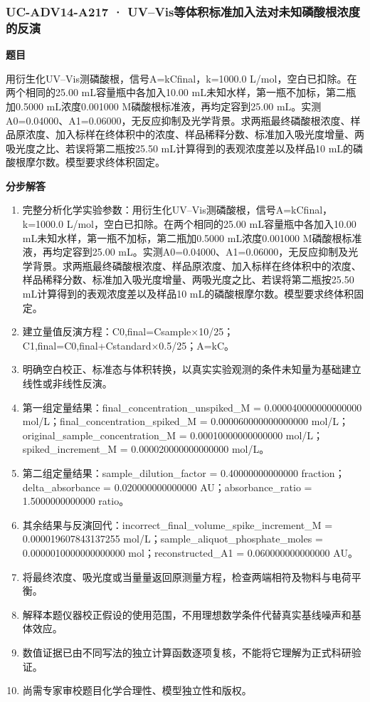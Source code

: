 \documentclass[UTF8,11pt,a4paper]{ctexart}
\begin{document}
\subsubsection*{UC-ADV14-A217 · UV–Vis等体积标准加入法对未知磷酸根浓度的反演}
\noindent\textbf{题目}\par
用衍生化UV–Vis测磷酸根，信号A=kCfinal，k=1000.0 L/mol，空白已扣除。在两个相同的25.00 mL容量瓶中各加入10.00 mL未知水样，第一瓶不加标，第二瓶加0.5000 mL浓度0.001000 M磷酸根标准液，再均定容到25.00 mL。实测A0=0.04000、A1=0.06000，无反应抑制及光学背景。求两瓶最终磷酸根浓度、样品原浓度、加入标样在终体积中的浓度、样品稀释分数、标准加入吸光度增量、两吸光度之比、若误将第二瓶按25.50 mL计算得到的表观浓度差以及样品10 mL的磷酸根摩尔数。模型要求终体积固定。\par
\medskip\noindent\textbf{分步解答}
\begin{enumerate}
\item 完整分析化学实验参数：用衍生化UV–Vis测磷酸根，信号A=kCfinal，k=1000.0 L/mol，空白已扣除。在两个相同的25.00 mL容量瓶中各加入10.00 mL未知水样，第一瓶不加标，第二瓶加0.5000 mL浓度0.001000 M磷酸根标准液，再均定容到25.00 mL。实测A0=0.04000、A1=0.06000，无反应抑制及光学背景。求两瓶最终磷酸根浓度、样品原浓度、加入标样在终体积中的浓度、样品稀释分数、标准加入吸光度增量、两吸光度之比、若误将第二瓶按25.50 mL计算得到的表观浓度差以及样品10 mL的磷酸根摩尔数。模型要求终体积固定。
\item 建立量值反演方程：C0,final=Csample×10/25；C1,final=C0,final+Cstandard×0.5/25；A=kC。
\item 明确空白校正、标准态与体积转换，以真实实验观测的条件未知量为基础建立线性或非线性反演。
\item 第一组定量结果：final\_concentration\_unspiked\_M = 0.000040000000000000 mol/L；final\_concentration\_spiked\_M = 0.000060000000000000 mol/L；original\_sample\_concentration\_M = 0.00010000000000000 mol/L；spiked\_increment\_M = 0.000020000000000000 mol/L。
\item 第二组定量结果：sample\_dilution\_factor = 0.40000000000000 fraction；delta\_absorbance = 0.020000000000000 AU；absorbance\_ratio = 1.5000000000000 ratio。
\item 其余结果与反演回代：incorrect\_final\_volume\_spike\_increment\_M = 0.000019607843137255 mol/L；sample\_aliquot\_phosphate\_moles = 0.0000010000000000000 mol；reconstructed\_A1 = 0.060000000000000 AU。
\item 将最终浓度、吸光度或当量量返回原测量方程，检查两端相符及物料与电荷平衡。
\item 解释本题仪器校正假设的使用范围，不用理想数学条件代替真实基线噪声和基体效应。
\item 数值证据已由不同写法的独立计算函数逐项复核，不能将它理解为正式科研验证。
\item 尚需专家审校题目化学合理性、模型独立性和版权。
\end{enumerate}
\end{document}
